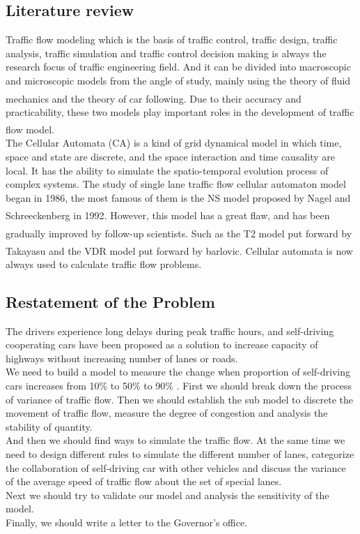 \documentclass{mcmthesis}
\newcommand{\upcite}[1]{\textsuperscript{\textsuperscript{\cite{#1}}}}
\begin{document}
\subsection{Literature review}
\indent Traffic flow modeling which is the basis of traffic control, traffic design, traffic analysis, traffic simulation and traffic control decision making is always the research focus of traffic engineering field. And it can be divided into macroscopic and microscopic models from the angle of study, mainly using the theory of fluid mechanics and the theory of car following\upcite{TF1}. Due to their accuracy and practicability, these two models play important roles in the development of traffic flow model\upcite{TF2}.\\
\indent The Cellular Automata (CA) is a kind of grid dynamical model in which time, space and state are discrete, and the space interaction and time causality are local. It has the ability to simulate the spatio-temporal evolution process of complex systems. The study of single lane traffic flow cellular automaton model began in 1986, the most famous of them is the NS model proposed by Nagel and Schreeckenberg in 1992\upcite{ca1}. However, this model has a great flaw, and has been gradually improved by follow-up scientists. Such as the T2 model\upcite{ca2} put forward by Takayasu and the VDR model\upcite{ca3} put forward by barlovic. Cellular automata is now always used to calculate traffic flow problems.\\
\indent %



\subsection{Restatement of the Problem}
The drivers experience long delays during peak traffic hours, and self-driving cooperating cars have been proposed as a solution to increase capacity of highways without increasing number of lanes or roads.\\
\indent We need to build a model to measure the change when proportion of self-driving cars increases from  10\% to 50\% to 90\% . First we should break down the process of variance of traffic flow. Then we should establish the sub model to discrete the movement of traffic flow, measure the degree of congestion and analysis the stability of quantity.\\
\indent And then we should find ways to simulate the traffic flow. At the same time we need to design different rules to simulate the different number of lanes, categorize the collaboration of self-driving car with other vehicles and discuss the variance of the average speed of traffic flow about the set of special lanes.\\
\indent Next we should try to validate our model and analysis the sensitivity of the model.\\
\indent Finally, we should write a letter to the Governor's office.
\end{document}
